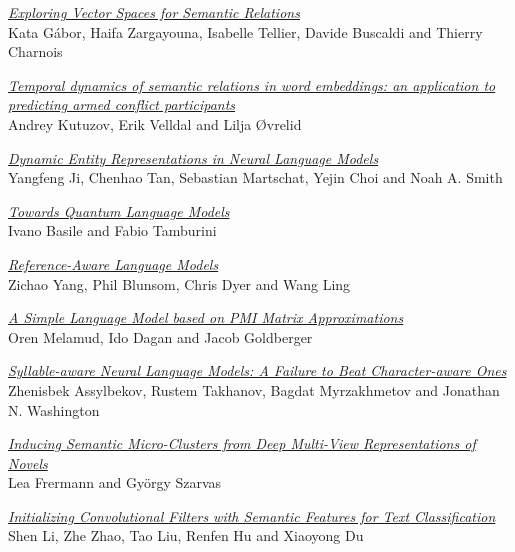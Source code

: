 \hyperlink{page.1814}{\em Exploring Vector Spaces for Semantic Relations}\samepage \\
\hspace*{7mm} Kata G\'{a}bor, Haifa Zargayouna, Isabelle Tellier, Davide Buscaldi and Thierry Charnois\dotfill {}

\hyperlink{page.1824}{\em Temporal dynamics of semantic relations in word embeddings: an application to predicting armed conflict participants}\samepage \\
\hspace*{7mm} Andrey Kutuzov, Erik Velldal and Lilja {\O}vrelid\dotfill {}

\hyperlink{page.1830}{\em Dynamic Entity Representations in Neural Language Models}\samepage \\
\hspace*{7mm} Yangfeng Ji, Chenhao Tan, Sebastian Martschat, Yejin Choi and Noah A. Smith\dotfill {}

\hyperlink{page.1840}{\em Towards Quantum Language Models}\samepage \\
\hspace*{7mm} Ivano Basile and Fabio Tamburini\dotfill {}

\hyperlink{page.1850}{\em Reference-Aware Language Models}\samepage \\
\hspace*{7mm} Zichao Yang, Phil Blunsom, Chris Dyer and Wang Ling\dotfill {}

\hyperlink{page.1860}{\em A Simple Language Model based on PMI Matrix Approximations}\samepage \\
\hspace*{7mm} Oren Melamud, Ido Dagan and Jacob Goldberger\dotfill {}

\hyperlink{page.1866}{\em Syllable-aware Neural Language Models: A Failure to Beat Character-aware Ones}\samepage \\
\hspace*{7mm} Zhenisbek Assylbekov, Rustem Takhanov, Bagdat Myrzakhmetov and Jonathan N. Washington\dotfill {}

\hyperlink{page.1873}{\em Inducing Semantic Micro-Clusters from Deep Multi-View Representations of Novels}\samepage \\
\hspace*{7mm} Lea Frermann and Gy\"{o}rgy Szarvas\dotfill {}

\hyperlink{page.1884}{\em Initializing Convolutional Filters with Semantic Features for Text Classification}\samepage \\
\hspace*{7mm} Shen Li, Zhe Zhao, Tao Liu, Renfen Hu and Xiaoyong Du\dotfill {}

